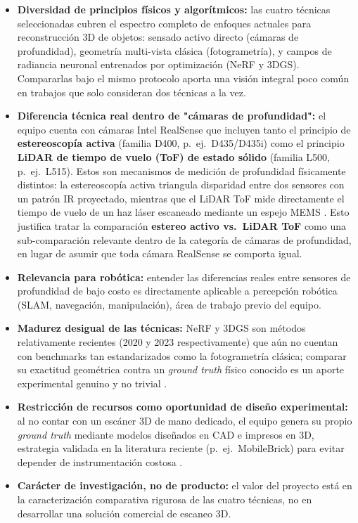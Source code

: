 \documentclass[11pt]{article}
\begin{document}
\begin{itemize}
    \item \textbf{Diversidad de principios f\'isicos y algor\'itmicos:} las cuatro t\'ecnicas seleccionadas cubren el espectro completo de enfoques actuales para reconstrucci\'on 3D de objetos: sensado activo directo (c\'amaras de profundidad), geometr\'ia multi-vista cl\'asica (fotogrametr\'ia), y campos de radiancia neuronal entrenados por optimizaci\'on (NeRF y 3DGS). Compararlas bajo el mismo protocolo aporta una visi\'on integral poco com\'un en trabajos que solo consideran dos t\'ecnicas a la vez.
    \item \textbf{Diferencia t\'ecnica real dentro de "c\'amaras de profundidad":} el equipo cuenta con c\'amaras Intel RealSense que incluyen tanto el principio de \textbf{estereoscop\'ia activa} (familia D400, p.\ ej.\ D435/D435i) como el principio \textbf{LiDAR de tiempo de vuelo (ToF) de estado s\'olido} (familia L500, p.\ ej.\ L515). Estos son mecanismos de medici\'on de profundidad f\'isicamente distintos: la estereoscop\'ia activa triangula disparidad entre dos sensores con un patr\'on IR proyectado, mientras que el LiDAR ToF mide directamente el tiempo de vuelo de un haz l\'aser escaneado mediante un espejo MEMS \cite{realsense_lidar_multisensor,realsense_transparent}. Esto justifica tratar la comparaci\'on \textbf{estereo activo vs.\ LiDAR ToF} como una sub-comparaci\'on relevante dentro de la categor\'ia de c\'amaras de profundidad, en lugar de asumir que toda c\'amara RealSense se comporta igual.
    \item \textbf{Relevancia para rob\'otica:} entender las diferencias reales entre sensores de profundidad de bajo costo es directamente aplicable a percepci\'on rob\'otica (SLAM, navegaci\'on, manipulaci\'on), \'area de trabajo previo del equipo.
    \item \textbf{Madurez desigual de las t\'ecnicas:} NeRF y 3DGS son m\'etodos relativamente recientes (2020 y 2023 respectivamente) que a\'un no cuentan con benchmarks tan estandarizados como la fotogrametr\'ia cl\'asica; comparar su exactitud geom\'etrica contra un \emph{ground truth} f\'isico conocido es un aporte experimental genuino y no trivial \cite{nerf_gs_sfm_heritage}.
    \item \textbf{Restricci\'on de recursos como oportunidad de dise\~no experimental:} al no contar con un esc\'aner 3D de mano dedicado, el equipo genera su propio \emph{ground truth} mediante modelos dise\~nados en CAD e impresos en 3D, estrategia validada en la literatura reciente (p.\ ej.\ MobileBrick) para evitar depender de instrumentaci\'on costosa \cite{mobilebrick,sdf2sdf}.
    \item \textbf{Car\'acter de investigaci\'on, no de producto:} el valor del proyecto est\'a en la caracterizaci\'on comparativa rigurosa de las cuatro t\'ecnicas, no en desarrollar una soluci\'on comercial de escaneo 3D.
\end{itemize}
\end{document}
